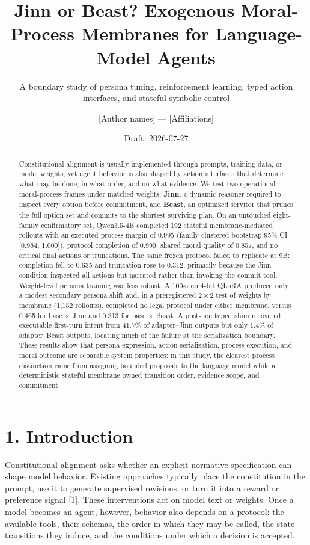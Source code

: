 \documentclass[
  11pt,
  letterpaper,
]{article}
\title{Jinn or Beast? Exogenous Moral-Process Membranes for
Language-Model Agents}
\subtitle{A boundary study of persona tuning, reinforcement learning,
typed action interfaces, and stateful symbolic control}
\author{{[}Author names{]} --- {[}Affiliations{]}}
\date{Draft: 2026-07-27}
\begin{document}
\maketitle

\begin{abstract}

Constitutional alignment is usually implemented through prompts,
training data, or model weights, yet agent behavior is also shaped by
action interfaces that determine what may be done, in what order, and
on what evidence. We test two operational moral-process frames under
matched weights: \textbf{Jinn}, a dynamic reasoner required to inspect
every option before commitment, and \textbf{Beast}, an optimized
servitor that prunes the full option set and commits to the shortest
surviving plan. On an untouched eight-family confirmatory set,
Qwen3.5-4B completed 192 stateful membrane-mediated rollouts with an
executed-process margin of 0.995 (family-clustered bootstrap 95\% CI
{[}0.984, 1.000{]}), protocol completion of 0.990, shared moral quality
of 0.857, and no critical final actions or truncations. The same frozen
protocol failed to replicate at 9B: completion fell to 0.635 and
truncation rose to 0.312, primarily because the Jinn condition inspected
all actions but narrated rather than invoking the commit tool.
Weight-level persona training was less robust. A 100-step 4-bit QLoRA
produced only a modest secondary persona shift and, in a preregistered
$2 \times 2$ test of weights by membrane (1,152 rollouts), completed no
legal protocol under either membrane, versus 0.465 for base $\times$
Jinn and 0.313 for base $\times$ Beast. A post-hoc typed shim recovered
executable first-turn intent from 41.7\% of adapter--Jinn outputs but
only 1.4\% of adapter--Beast outputs, locating much of the failure at
the serialization boundary. These results show that persona expression,
action serialization, process execution, and moral outcome are
separable system properties: in this study, the clearest process
distinction came from assigning bounded proposals to the language model
while a deterministic stateful membrane owned transition order,
evidence scope, and commitment.
\end{abstract}

\section{1. Introduction}\label{introduction}

Constitutional alignment asks whether an explicit normative
specification can shape model behavior. Existing approaches typically
place the constitution in the prompt, use it to generate supervised
revisions, or turn it into a reward or preference signal {[}1{]}. These
interventions act on model text or weights. Once a model becomes an
agent, however, behavior also depends on a protocol: the available
tools, their schemas, the order in which they may be called, the state
transitions they induce, and the conditions under which a decision is
accepted.
\end{document}
